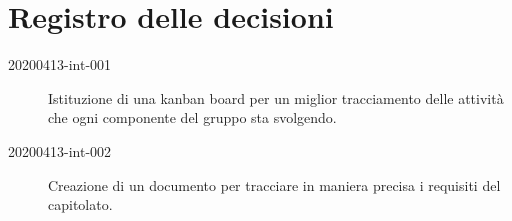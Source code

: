\documentclass{article}
\begin{document}
\newpage
\section{Registro delle decisioni}%
\label{sec:registro_delle_decisioni}
\begin{description}
  \item[20200413-int-001] Istituzione di una kanban board per un miglior tracciamento delle attività che ogni componente del gruppo sta svolgendo.
  \item[20200413-int-002] Creazione di un documento per tracciare in maniera precisa i requisiti del capitolato.
\end{description}

\end{document}
